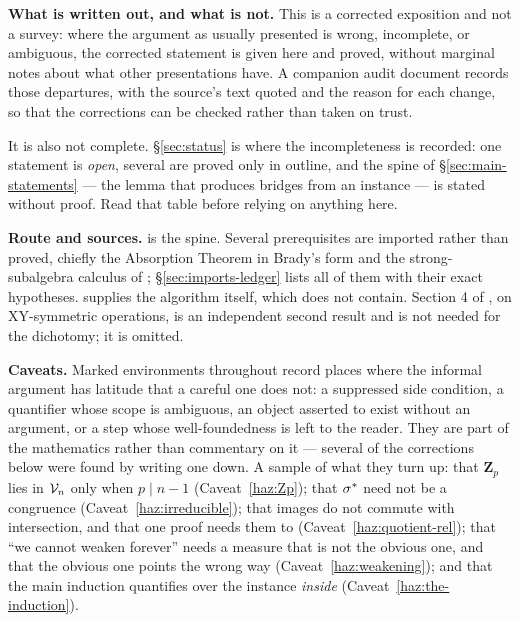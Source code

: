 \documentclass[11pt]{article}
\begin{document}
\medskip

\noindent\textbf{What is written out, and what is not.} This is a corrected
exposition and not a survey: where the argument as usually presented is wrong,
incomplete, or ambiguous, the corrected statement is given here and proved,
without marginal notes about what other presentations have. A companion audit
document records those departures, with the source's text quoted and the reason
for each change, so that the corrections can be checked rather than taken on
trust.

It is also not complete. \S\ref{sec:status} is where the incompleteness is
recorded: one statement is \emph{open}, several are proved only in outline, and
the spine of \S\ref{sec:main-statements} --- the lemma that produces bridges
from an instance --- is stated without proof. Read that table before relying on
anything here.

\medskip

\noindent\textbf{Route and sources.} \cite{ZhukSimplified} is the spine.
Several prerequisites are imported rather than proved, chiefly the Absorption
Theorem in Brady's form \cite{BradyNotes} and the strong-subalgebra calculus of
\cite{ZhukStrong}; \S\ref{sec:imports-ledger} lists all of them with their
exact hypotheses. \cite{ZhukJACM} supplies the algorithm itself, which
\cite{ZhukSimplified} does not contain. Section 4 of \cite{ZhukSimplified}, on
XY-symmetric operations, is an independent second result and is not needed for
the dichotomy; it is omitted.

\medskip

\noindent\textbf{Caveats.} Marked environments throughout record places where
the informal argument has latitude that a careful one does not: a suppressed
side condition, a quantifier whose scope is ambiguous, an object asserted to
exist without an argument, or a step whose well-foundedness is left to the
reader. They are part of the mathematics rather than commentary on it ---
several of the corrections below were found by writing one down. A sample of
what they turn up: that $\mathbf Z_{p}$ lies in $\mathcal V_{n}$ only when $p\mid n-1$
(Caveat~\ref{haz:Zp}); that $\sigma^{*}$ need not be a congruence
(Caveat~\ref{haz:irreducible}); that images do not commute with intersection,
and that one proof needs them to (Caveat~\ref{haz:quotient-rel}); that ``we
cannot weaken forever'' needs a measure that is not the obvious one, and that
the obvious one points the wrong way (Caveat~\ref{haz:weakening}); and that the
main induction quantifies over the instance \emph{inside}
(Caveat~\ref{haz:the-induction}).

\clearpage

\clearpage


\clearpage

\clearpage

\clearpage



\clearpage

\clearpage

\clearpage

\clearpage


\clearpage

\end{document}
